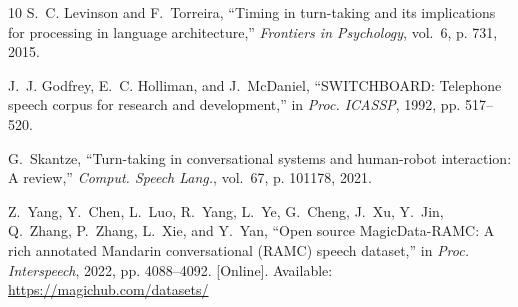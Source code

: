 \documentclass[10pt,journal,compsoc]{IEEEtran}
\begin{document}
\begin{thebibliography}{10}
S.~C. Levinson and F.~Torreira, ``Timing in turn-taking and its implications for processing in language architecture,'' \emph{Frontiers in Psychology}, vol.~6, p. 731, 2015.

J.~J. Godfrey, E.~C. Holliman, and J.~McDaniel, ``SWITCHBOARD: Telephone speech corpus for research and development,'' in \emph{Proc. ICASSP}, 1992, pp. 517--520.

G.~Skantze, ``Turn-taking in conversational systems and human-robot interaction: A review,'' \emph{Comput. Speech Lang.}, vol.~67, p. 101178, 2021.

Z.~Yang, Y.~Chen, L.~Luo, R.~Yang, L.~Ye, G.~Cheng, J.~Xu, Y.~Jin, Q.~Zhang, P.~Zhang, L.~Xie, and Y.~Yan, ``Open source MagicData-RAMC: A rich annotated Mandarin conversational (RAMC) speech dataset,'' in \emph{Proc. Interspeech}, 2022, pp. 4088--4092. [Online]. Available: \url{https://magichub.com/datasets/}

\end{thebibliography}
\end{document}
